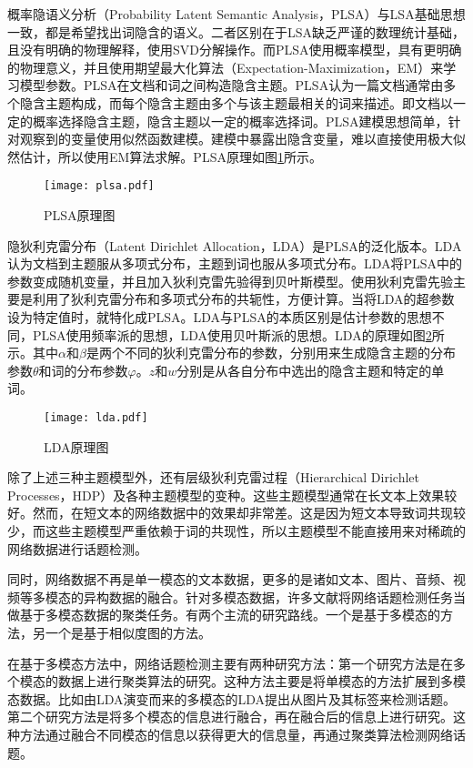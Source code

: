 概率隐语义分析（Probability Latent Semantic Analysis，PLSA）\citep{Hofmann1999PLSA}与LSA基础思想一致，都是希望找出词隐含的语义。二者区别在于LSA缺乏严谨的数理统计基础，且没有明确的物理解释，使用SVD分解操作。而PLSA使用概率模型，具有更明确的物理意义，并且使用期望最大化算法（Expectation-Maximization，EM）来学习模型参数。PLSA在文档和词之间构造隐含主题。PLSA认为一篇文档通常由多个隐含主题构成，而每个隐含主题由多个与该主题最相关的词来描述。即文档以一定的概率选择隐含主题，隐含主题以一定的概率选择词。PLSA建模思想简单，针对观察到的变量使用似然函数建模。建模中暴露出隐含变量，难以直接使用极大似然估计，所以使用EM算法求解。PLSA原理如图\ref{fig:plsa}所示。
\begin{figure}[!htbp]
    \centering
    \texttt{[image: plsa.pdf]}
    \caption{PLSA原理图}
    \label{fig:plsa}
\end{figure}

隐狄利克雷分布（Latent Dirichlet Allocation，LDA）\citep{blei-2003-LDA}是PLSA的泛化版本。LDA认为文档到主题服从多项式分布，主题到词也服从多项式分布。LDA将PLSA中的参数变成随机变量，并且加入狄利克雷先验得到贝叶斯模型。使用狄利克雷先验主要是利用了狄利克雷分布和多项式分布的共轭性，方便计算。当将LDA的超参数设为特定值时，就特化成PLSA。LDA与PLSA的本质区别是估计参数的思想不同，PLSA使用频率派的思想，LDA使用贝叶斯派的思想。LDA的原理如图\ref{fig:lda}所示。其中$\alpha$和$\beta$是两个不同的狄利克雷分布的参数，分别用来生成隐含主题的分布参数$\theta$和词的分布参数$\varphi$。$z$和$w$分别是从各自分布中选出的隐含主题和特定的单词。
\begin{figure}[!htbp]
    \centering
    \texttt{[image: lda.pdf]}
    \caption{LDA原理图}
    \label{fig:lda}
\end{figure}

除了上述三种主题模型外，还有层级狄利克雷过程（Hierarchical Dirichlet Processes，HDP）\citep{the2006hierarchical}及各种主题模型的变种。这些主题模型通常在长文本上效果较好。然而，在短文本的网络数据中的效果却非常差。这是因为短文本导致词共现较少，而这些主题模型严重依赖于词的共现性，所以主题模型不能直接用来对稀疏的网络数据进行话题检测。

同时，网络数据不再是单一模态的文本数据，更多的是诸如文本、图片、音频、视频等多模态的异构数据的融合。针对多模态数据，许多文献将网络话题检测任务当做基于多模态数据的聚类任务。有两个主流的研究路线。一个是基于多模态的方法\citep{blei-lafferty-2007-correlatedtopicmodel,putthividhy-2010-multimodalLDA}，另一个是基于相似度图的方法\cite{papadopoulos-2011-cluster}。

在基于多模态方法中，网络话题检测主要有两种研究方法：第一个研究方法是在多个模态的数据上进行聚类算法的研究。这种方法主要是将单模态的方法扩展到多模态数据。比如由LDA演变而来的多模态的LDA\citep{putthividhy-2010-multimodalLDA}提出从图片及其标签来检测话题。第二个研究方法是将多个模态的信息进行融合，再在融合后的信息上进行研究\cite{jia2011learning,Oh2014multimedia}。这种方法通过融合不同模态的信息以获得更大的信息量，再通过聚类算法检测网络话题。

